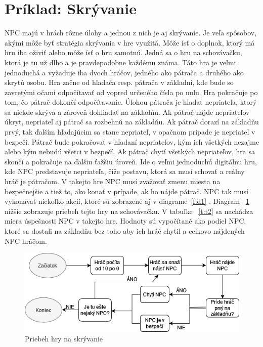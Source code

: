 \documentclass[10pt,twoside,slovak,a4paper]{article}
\begin{document}
\section{Príklad: Skrývanie} 
\quad NPC majú v hrách rôzne úlohy a jednou z nich je aj skrývanie. Je veľa spôsobov, akými môže byť stratégia skrývania v hre využitá. Môže ísť o doplnok, ktorý má hru iba oživiť alebo môže ísť o hru samotnú. Jedná sa o hru na schovávačku, ktorá je tu už dlho a je pravdepodobne každému známa. Táto hra je veľmi jednoduchá a vyžaduje iba dvoch hráčov, jedného ako pátrača a druhého ako skrytú osobu. Hra začne od hľadača resp. pátrača v základni, kde bude so zavretými očami odpočítavať od vopred určeného čísla po nulu. Hra pokračuje po tom, čo pátrač dokončí odpočítavanie. Úlohou pátrača je hľadať nepriateľa, ktorý sa niekde skrýva a zároveň dohliadať na základňu. Ak pátrač nájde nepriateľov úkryt, nepriateľ aj pátrač sa rozbehnú na základňu. Ak pátrač dorazí na základňu prvý, tak ďalším hľadajúcim sa stane nepriateľ, v opačnom prípade je nepriateľ v bezpečí. Pátrač bude pokračovať v hľadaní nepriateľov, kým ich všetkých nezajme alebo kým nebudú všetci v bezpečí. Ak pátrač chytí všetkých nepriateľov, hra sa skončí a pokračuje na ďalšiu ťažšiu úroveň.  \cite{NPC}  Ide o veľmi jednoduchú digitálnu hru, kde NPC predstavuje nepriateľa, čiže postavu, ktorá sa musí schovať a reálny hráč je pátračom. V takejto hre NPC musí zvažovať zmenu miesta na bezpečnejšie a tiež to, ako konať v prípade, ak ho nájde pátrač. NPC tak musí vykonávať niekoľko akcií, ktoré sú zobrazené aj v diagrame~\ref{f:d1} . Diagram \cite{NPC} ~\ref{f:d2} nižšie zobrazuje priebeh tejto hry na schovávačku. V tabuľke \cite{NPC} ~\ref{t:t2} sa nachádza miera úspešnosti NPC v takejto hre. Hodnoty sú vypočítané ako podiel NPC, ktoré sa dostali na základňu bez toho aby ich hráč chytil a celkovo nájdených NPC hráčom.
\begin{figure}[tbh]
\center\includegraphics[scale=0.5]{diagram2.png}
\caption{Priebeh hry na skrývanie} 
\label{f:d2} 
\end{figure}
\end{document}
